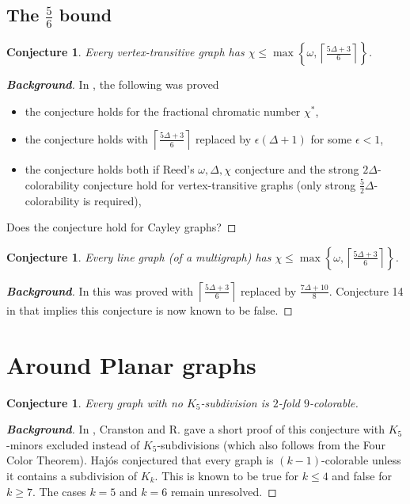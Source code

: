 \documentclass[12pt]{article}
\theoremstyle{plain}
\newtheorem{conjecture}[thm]{Conjecture}
\theoremstyle{definition}
\theoremstyle{remark}
\newcommand{\set}[1]{\left\{ #1 \right\}}
\newcommand{\ceil}[1]{\left\lceil#1\right\rceil}
\begin{document}
\subsection{The $\frac56$ bound}
\begin{conjecture}
Every vertex-transitive graph has $\chi \le \max \set{\omega, \ceil{\frac{5\Delta + 3}{6}}}$.
\end{conjecture}
\begin{proof}[\textbf{Background}]
In \cite{vertextransitive}, the following was proved
\begin{itemize}
\item the conjecture holds for the fractional chromatic number $\chi^*$,
\item the conjecture holds with $\ceil{\frac{5\Delta + 3}{6}}$ replaced by $\epsilon(\Delta + 1)$ for some $\epsilon < 1$,
\item the conjecture holds both if Reed's $\omega, \Delta, \chi$ conjecture and the strong $2\Delta$-colorability conjecture hold for vertex-transitive graphs (only strong $\frac52\Delta$-colorability is required),
\end{itemize}
Does the conjecture hold for Cayley graphs?
\end{proof}

\begin{conjecture}
Every line graph (of a multigraph) has $\chi \le \max \set{\omega, \ceil{\frac{5\Delta + 3}{6}}}$.
\end{conjecture}
\begin{proof}[\textbf{Background}]
In \cite{rabern2011strengthening} this was proved with $\ceil{\frac{5\Delta + 3}{6}}$ replaced by $\frac{7\Delta + 10}{8}$.  
Conjecture 14 in \cite{rabern2011strengthening} that implies this conjecture is now known to be false.
\end{proof}

\section{Around Planar graphs}
\begin{conjecture}
Every graph with no $K_5$-subdivision is $2$-fold $9$-colorable.
\end{conjecture}
\begin{proof}[\textbf{Background}]
In \cite{planar92}, Cranston and R. gave a short proof of this conjecture with $K_5$-minors excluded instead of $K_5$-subdivisions (which also follows from the Four Color Theorem).  Haj{\'o}s conjectured that every graph is $(k-1)$-colorable unless it contains a subdivision of
$K_k$. This is known to be true for $k \le 4$ and false for $k \ge 7$. The cases $k = 5$ and $k = 6$ remain unresolved.
\end{proof}
\end{document}
